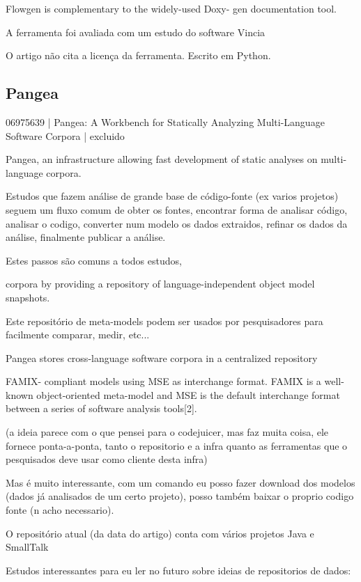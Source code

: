 Flowgen is complementary to the widely-used Doxy-
gen documentation tool.

A ferramenta foi avaliada com um estudo do software Vincia

O artigo não cita a licença da ferramenta. Escrito em Python.

\subsection{Pangea}

06975639 | Pangea: A Workbench for Statically Analyzing Multi-Language Software Corpora | excluido

Pangea,
an infrastructure allowing fast
development of static analyses on multi-language corpora.

Estudos que fazem análise de grande base de código-fonte (ex varios projetos)
seguem um fluxo comum de obter os fontes, encontrar forma de analisar código,
analisar o codigo, converter num modelo os dados extraidos, refinar os dados
da análise, finalmente publicar a análise.

Estes passos são comuns a todos estudos, 

corpora by providing a
repository of language-independent object model snapshots.

Este repositório de meta-models podem ser usados por pesquisadores para
facilmente comparar, medir, etc...

Pangea stores cross-language software corpora in a centralized repository

FAMIX-
compliant models using MSE as interchange format.
FAMIX is a well-known object-oriented meta-model and
MSE is the default interchange format between a series
of software analysis tools[2].

(a ideia parece com o que pensei para o codejuicer, mas faz muita coisa, ele
fornece ponta-a-ponta, tanto o repositorio e a infra quanto as ferramentas que
o pesquisados deve usar como cliente desta infra)

Mas é muito interessante, com um comando eu posso fazer download dos modelos
(dados já analisados de um certo projeto), posso também baixar o proprio
codigo fonte (n acho necessario).

O repositório atual (da data do artigo) conta com vários projetos Java e
SmallTalk

Estudos interessantes para eu ler no futuro sobre ideias de repositorios de
dados:

